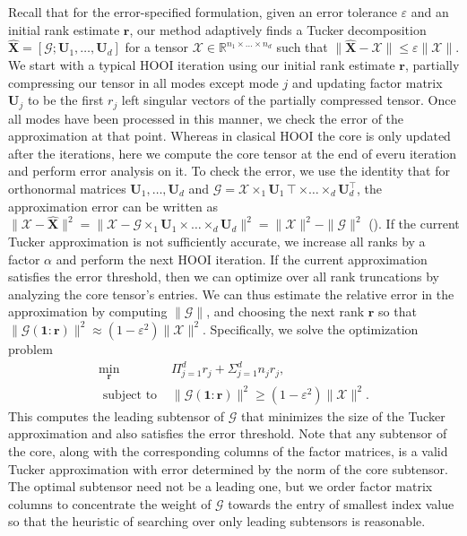     Recall that for the error-specified formulation, given an error tolerance
    $\varepsilon$ and an initial rank estimate $\mathbf{r}$, our method adaptively
    finds a Tucker decomposition $\mathbf{\hat{X}} = [\mathcal{G}; \mathbf{U}_{1}, \dots,
    \mathbf{U}_{d}]$ for a tensor $\mathcal{X} \in \mathbb{R}^{n_1 \times \dots \times
    n_d}$ such that $\| \mathbf{\hat{X}} - \mathcal{X} \| \leq \varepsilon \| \mathcal{X} \|$.
    We start with a typical HOOI iteration using our initial rank estimate
    $\mathbf{r}$, partially compressing our tensor in all modes except mode $j$ and
    updating factor matrix $\mathbf{U}_{j}$ to be the first $r_j$ left singular
    vectors of the partially compressed tensor. Once all modes have been
    processed in this manner, we check the error of the approximation at that
    point. 
    Whereas in clasical HOOI the core is only updated after the iterations, here
    we compute the core tensor at the end of everu iteration and perform error
    analysis on it. To check the error, we use the identity that for orthonormal
    matrices $\mathbf{U}_{1},\dots,\mathbf{U}_{d}$ and $\mathcal{G} = \mathcal{X} \times_1
    \mathbf{U}_{1}\intercal \times \dots \times_d \mathbf{U}_{d}^\intercal$, the approximation error can be
    written as $\| \mathcal{X} - \mathbf{\hat{X}} \|^2 = \| \mathcal{X} - \mathcal{G} \times_1
    \mathbf{U}_{1} \times \dots \times_d \mathbf{U}_{d} \|^2 = \| \mathcal{X} \|^2 - \| \mathcal{G}
    \|^2$ (\cite[Proposition 6.3]{BK25}). If the current Tucker approximation is
    not sufficiently accurate, we increase all ranks by a factor $\alpha$ and
    perform the next HOOI iteration. If the current approximation satisfies the
    error threshold, then we can optimize over all rank truncations by analyzing
    the core tensor's entries.
    We can thus estimate the relative error in the approximation by computing
    $\| \mathcal{G} \|$, and choosing the next rank $\mathbf{r}$ so that $\|
    \mathcal{G}(\mathbf{1}:\mathbf{r})\|^2 \approx (1 - \varepsilon^2) \| \mathcal{X} \|^2.$ 
    Specifically, we solve the optimization problem
    \begin{equation}\label{eq:rankcond}
    \begin{aligned}
    \min_{\mathbf{r}}  \quad & \Pi_{j=1}^d r_j + \Sigma_{j=1}^{d} n_j r_j,\\ 
    \text{ subject to } &\|\mathcal{G}(\mathbf{1}:\mathbf{r}) \|^2 \geq (1 - \varepsilon^2) \| \mathcal{X} \|^2.
    \end{aligned}
    \end{equation}
    This computes the leading subtensor of $\mathcal{G}$ that minimizes the size of
    the Tucker approximation and also satisfies the error threshold. Note that
    any subtensor of the core, along with the corresponding columns of the
    factor matrices, is a valid Tucker approximation with error determined by
    the norm of the core subtensor. The optimal subtensor need not be a leading
    one, but we order factor matrix columns to concentrate the weight of
    $\mathcal{G}$ towards the entry of smallest index value so that the heuristic of
    searching over only leading subtensors is reasonable.

